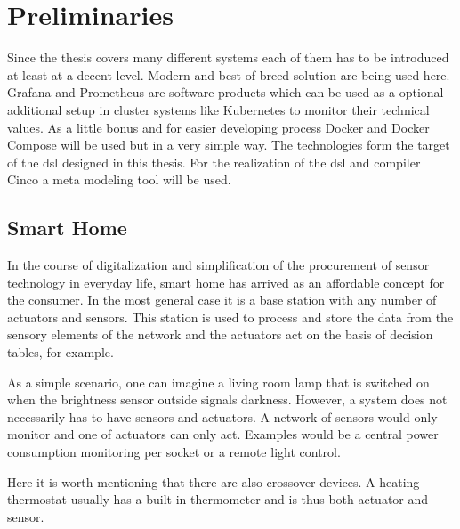 \chapter{Preliminaries}
\label{chapter:grundlagen}
Since the thesis covers many different systems each of them has to be introduced at least at a decent level. Modern and best of breed solution are being used here. Grafana and Prometheus are software products which can be used as a optional additional setup in cluster systems like Kubernetes to monitor their technical values. As a little bonus and for easier developing process Docker and Docker Compose will be used but in a very simple way. The technologies form the target of the \gls{dsl} designed in this thesis. For the realization of the \gls{dsl} and compiler Cinco a meta modeling tool will be used.
 
\section{Smart Home}
In the course of digitalization and simplification of the procurement of sensor technology in everyday life, smart home has arrived as an affordable concept for the consumer. In the most general case it is a base station with any number of actuators and sensors. This station is used to process and store the data from the sensory elements of the network and the actuators act on the basis of decision tables, for example. 

As a simple scenario, one can imagine a living room lamp that is switched on when the brightness sensor outside signals darkness. However, a system does not necessarily has to have sensors and actuators. A network of sensors would only monitor and one of actuators can only act. Examples would be a central power consumption monitoring per socket or a remote light control.

Here it is worth mentioning that there are also crossover devices. A heating thermostat usually has a built-in thermometer and is thus both actuator and sensor.

